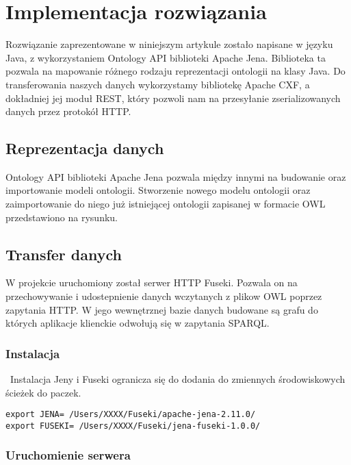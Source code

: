 \section{Implementacja rozwiązania}
\label{cha:impl}

Rozwiązanie zaprezentowane w niniejszym artykule zostało napisane w języku Java, z wykorzystaniem Ontology API biblioteki Apache Jena. Biblioteka ta pozwala na mapowanie różnego rodzaju reprezentacji ontologii na klasy Java. Do transferowania naszych danych wykorzystamy bibliotekę Apache CXF, a dokładniej jej moduł REST, który pozwoli nam na przesyłanie zserializowanych danych przez protokół HTTP.

\subsection{Reprezentacja danych}
\label{sec:persist}

Ontology API biblioteki Apache Jena pozwala między innymi na budowanie oraz importowanie modeli ontologii. Stworzenie nowego modelu ontologii oraz zaimportowanie do niego już istniejącej ontologii zapisanej w formacie OWL przedstawiono na rysunku.

\subsection{Transfer danych}
\label{sec:transfer}

W projekcie uruchomiony został serwer HTTP Fuseki. Pozwala on na przechowywanie i udostepnienie danych wczytanych z plikow OWL poprzez zapytania HTTP. W jego wewnętrznej bazie danych budowane są grafu do których aplikacje klienckie odwołują się w zapytania SPARQL.

\subsubsection{Instalacja}

~Instalacja Jeny i Fuseki ogranicza się do dodania do zmiennych środowiskowych ścieżek do paczek.
\begin{lstlisting}
export JENA= /Users/XXXX/Fuseki/apache-jena-2.11.0/
export FUSEKI= /Users/XXXX/Fuseki/jena-fuseki-1.0.0/
\end{lstlisting}

\subsubsection{Uruchomienie serwera}


